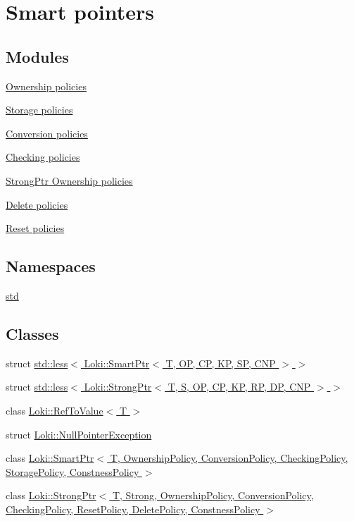 \hypertarget{group__SmartPointerGroup}{}\section{Smart pointers}
\label{group__SmartPointerGroup}
\subsection*{Modules}
\begin{DoxyCompactItemize}
\item 
\hyperlink{group__SmartPointerOwnershipGroup}{Ownership policies}
\item 
\hyperlink{group__SmartPointerStorageGroup}{Storage policies}
\item 
\hyperlink{group__SmartPointerConversionGroup}{Conversion policies}
\item 
\hyperlink{group__SmartPointerCheckingGroup}{Checking policies}
\item 
\hyperlink{group__StrongPointerOwnershipGroup}{Strong\+Ptr Ownership policies}
\item 
\hyperlink{group__StrongPointerDeleteGroup}{Delete policies}
\item 
\hyperlink{group__StrongPointerResetGroup}{Reset policies}
\end{DoxyCompactItemize}
\subsection*{Namespaces}
\begin{DoxyCompactItemize}
\item 
 \hyperlink{namespacestd}{std}
\end{DoxyCompactItemize}
\subsection*{Classes}
\begin{DoxyCompactItemize}
\item 
struct \hyperlink{structstd_1_1less_3_01Loki_1_1SmartPtr_3_01T_00_01OP_00_01CP_00_01KP_00_01SP_00_01CNP_01_4_01_4}{std\+::less$<$ Loki\+::\+Smart\+Ptr$<$ T, O\+P, C\+P, K\+P, S\+P, C\+N\+P $>$ $>$}
\item 
struct \hyperlink{structstd_1_1less_3_01Loki_1_1StrongPtr_3_01T_00_01S_00_01OP_00_01CP_00_01KP_00_01RP_00_01DP_00_01CNP_01_4_01_4}{std\+::less$<$ Loki\+::\+Strong\+Ptr$<$ T, S, O\+P, C\+P, K\+P, R\+P, D\+P, C\+N\+P $>$ $>$}
\item 
class \hyperlink{classLoki_1_1RefToValue}{Loki\+::\+Ref\+To\+Value$<$ T $>$}
\item 
struct \hyperlink{structLoki_1_1NullPointerException}{Loki\+::\+Null\+Pointer\+Exception}
\item 
class \hyperlink{classLoki_1_1SmartPtr}{Loki\+::\+Smart\+Ptr$<$ T, Ownership\+Policy, Conversion\+Policy, Checking\+Policy, Storage\+Policy, Constness\+Policy $>$}
\item 
class \hyperlink{classLoki_1_1StrongPtr}{Loki\+::\+Strong\+Ptr$<$ T, Strong, Ownership\+Policy, Conversion\+Policy, Checking\+Policy, Reset\+Policy, Delete\+Policy, Constness\+Policy $>$}
\end{DoxyCompactItemize}
